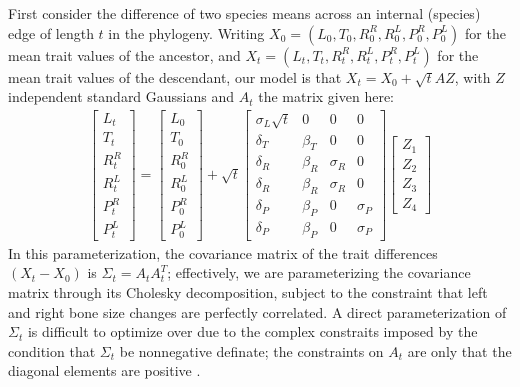 \documentclass[12pt]{article}
\begin{document}
First consider the difference of two species means across an internal (species) edge of length $t$ in the phylogeny.
Writing $X_0=(L_0,T_0,R^R_0,R^L_0,P^R_0,P^L_0)$ for the mean trait values of the ancestor,
and $X_t=(L_t,T_t,R^R_t,R^L_t,P^R_t,P^L_t)$ for the mean trait values of the descendant,
our model is that $X_t = X_0 + \sqrt{t} A Z$, with $Z$ independent standard Gaussians and $A_t$ the matrix given here:
\begin{align} \label{eqn:species_matrix}
\begin{bmatrix}
    L_t \\ T_t \\ R^R_t \\ R^L_t \\ P^R_t \\ P^L_t 
\end{bmatrix}
=
\begin{bmatrix}
    L_0 \\ T_0 \\ R^R_0 \\ R^L_0 \\ P^R_0 \\ P^L_0 
\end{bmatrix}
+
\sqrt{t}
\begin{bmatrix}
    \sigma_L \sqrt{t} &  0  & 0  & 0  \\
    \delta_T   &  \beta_T   & 0  &   0 \\
    \delta_R   &  \beta_R   & \sigma_R   &   0 \\
    \delta_R   &  \beta_R   & \sigma_R   &   0 \\
    \delta_P   &  \beta_P   & 0  &   \sigma_P  \\
    \delta_P   &  \beta_P   & 0  &   \sigma_P  
\end{bmatrix}
\begin{bmatrix}
    Z_1 \\ Z_2 \\ Z_3 \\ Z_4
\end{bmatrix}
\end{align}
In this parameterization, the covariance matrix of the trait differences $(X_t - X_0)$ is $\Sigma_t = A_t A_t^T$;
effectively, we are parameterizing the covariance matrix through its Cholesky decomposition,
subject to the constraint that left and right bone size changes are perfectly correlated.
A direct parameterization of $\Sigma_t$ is difficult to optimize over due to the complex constraits imposed by
the condition that $\Sigma_t$ be nonnegative definate;
the constraints on $A_t$ are only that the diagonal elements are positive \citep{pourahmadi1999joint}.
\end{document}
